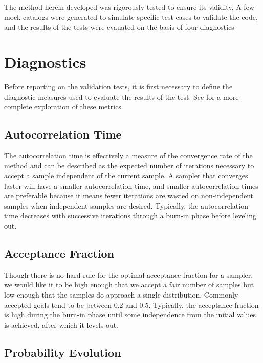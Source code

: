 \documentclass[12pt, onecolumn]{emulateapj}
\begin{document}

\appendix{}
\label{app:test}

The method herein developed was rigorously tested to ensure its validity.  A few mock catalogs were generated to simulate specific test cases to validate the code, and the results of the tests were evauated on the basis of four diagnostics

\section{Diagnostics}
\label{app:diag}

Before reporting on the validation tests, it is first necessary to define the diagnostic measures used to evaluate the results of the test.  See \citet{for12} for a more complete exploration of these metrics.

\subsection{Autocorrelation Time}
\label{app:acorr}

The autocorrelation time is effectively a measure of the convergence rate of the method and can be described as the expected number of iterations necessary to accept a sample independent of the current sample.  A sampler that converges faster will have a smaller autocorrelation time, and smaller autocorrelation times are preferable because it means fewer iterations are wasted on non-independent samples when independent samples are desired.  Typically, the autocorrelation time decreases with successive iterations through a burn-in phase before leveling out.

\subsection{Acceptance Fraction}
\label{app:afrac}

Though there is no hard rule for the optimal acceptance fraction for a sampler, we would like it to be high enough that we accept a fair number of samples but low enough that the samples do approach a single distribution.  Commonly accepted goals tend to be between 0.2 and 0.5.  Typically, the acceptance fraction is high during the burn-in phase until some independence from the initial values is achieved, after which it levels out.

\subsection{Probability Evolution}
\label{app:probs}
\end{document}
